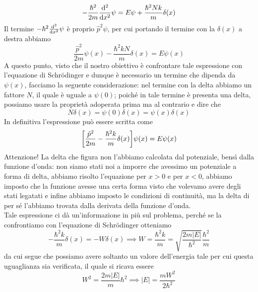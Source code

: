\begin{soluzione}
   \begin{equation*}
      -\frac{\hbar^2}{2m}\dv[2]{x}\psi=E\psi + \frac{\hbar^2 N k}{m}\delta(x)
   \end{equation*}
   Il termine $-\hbar^2\dv[2]{x}\psi$ è proprio $\hat{p}^2\psi$, per cui portando il termine con la $\delta(x)$ a destra abbiamo
   \begin{equation*}
      \frac{\hat{p}^2}{2m}\psi(x) - \frac{\hbar^2 k N}{m}\delta(x)
      =E\psi(x)
   \end{equation*}
   A questo punto, visto che il nostro obiettivo è confrontare tale espressione con l'equazione di Schrödinger e dunque è necessario un termine che dipenda da $\psi(x)$, facciamo la seguente considerazione: nel termine con la delta abbiamo un fattore $N$, il quale è uguale a $\psi(0)$; poiché in tale termine è presenta una delta, possiamo usare la proprietà adoperata prima ma al contrario e dire che
   \begin{equation*}
      N\delta(x)=\psi(0)\delta(x)=\psi(x)\delta(x)
   \end{equation*}
   In definitiva l'espressione può essere scritta come
   \begin{equation*}
      \qty[ \frac{\hat{p}^2}{2m} - \frac{\hbar^2 k}{m}\delta(x) ]\psi(x)
      =E\psi(x)
   \end{equation*}
   Attenzione! La delta che figura non l'abbiamo calcolata dal potenziale, bensì dalla funzione d'onda: non siamo stati noi a imporre che avessimo un potenziale a forma di delta, abbiamo risolto l'equazione per $x>0$ e per $x<0$, abbiamo imposto che la funzione avesse una certa forma visto che volevamo avere degli stati legatati e infine abbiamo imposto le condizioni di continuità, ma la delta di per sé l'abbiamo trovata dalla derivata della funzione d'onda.\\
   Tale espressione ci dà un'informazione in più sul problema, perché se la confrontiamo con l'equazione di Schrödinger otteniamo
   \begin{equation*}
      - \frac{\hbar^2 k}{m}\delta(x)=-W\delta(x)
      \implies
      W=\frac{\hbar^2 k}{m}
      =\sqrt{\frac{2m|E|}{\hbar^2}} \frac{\hbar^2}{m}
   \end{equation*}
   da cui segue che possiamo avere soltanto un valore dell'energia tale per cui questa uguaglianza sia verificata, il quale si ricava essere
   \begin{equation*}
      W^2=\frac{2m|E|}{m} \hbar^2
      \implies
      |E|=\frac{m W^2}{2\hbar^2}
   \end{equation*}

\end{soluzione}
